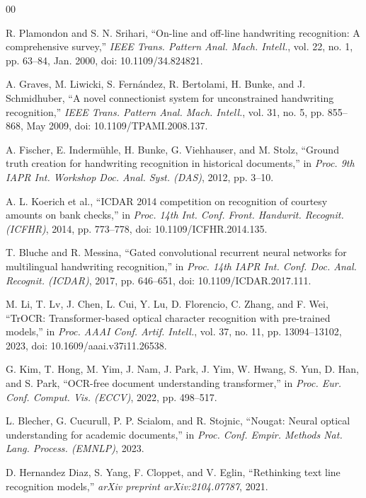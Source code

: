 \documentclass{IEEEtran}
\begin{document}
\begin{thebibliography}{00}

 R. Plamondon and S. N. Srihari, ``On-line and off-line handwriting recognition: A comprehensive survey,'' \emph{IEEE Trans. Pattern Anal. Mach. Intell.}, vol. 22, no. 1, pp. 63--84, Jan. 2000, doi: 10.1109/34.824821.

 A. Graves, M. Liwicki, S. Fern{\'a}ndez, R. Bertolami, H. Bunke, and J. Schmidhuber, ``A novel connectionist system for unconstrained handwriting recognition,'' \emph{IEEE Trans. Pattern Anal. Mach. Intell.}, vol. 31, no. 5, pp. 855--868, May 2009, doi: 10.1109/TPAMI.2008.137.

 A. Fischer, E. Inderm{\"u}hle, H. Bunke, G. Viehhauser, and M. Stolz, ``Ground truth creation for handwriting recognition in historical documents,'' in \emph{Proc. 9th IAPR Int. Workshop Doc. Anal. Syst. (DAS)}, 2012, pp. 3--10.

 A. L. Koerich et al., ``ICDAR 2014 competition on recognition of courtesy amounts on bank checks,'' in \emph{Proc. 14th Int. Conf. Front. Handwrit. Recognit. (ICFHR)}, 2014, pp. 773--778, doi: 10.1109/ICFHR.2014.135.

 T. Bluche and R. Messina, ``Gated convolutional recurrent neural networks for multilingual handwriting recognition,'' in \emph{Proc. 14th IAPR Int. Conf. Doc. Anal. Recognit. (ICDAR)}, 2017, pp. 646--651, doi: 10.1109/ICDAR.2017.111.

 M. Li, T. Lv, J. Chen, L. Cui, Y. Lu, D. Florencio, C. Zhang, and F. Wei, ``TrOCR: Transformer-based optical character recognition with pre-trained models,'' in \emph{Proc. AAAI Conf. Artif. Intell.}, vol. 37, no. 11, pp. 13094--13102, 2023, doi: 10.1609/aaai.v37i11.26538.

 G. Kim, T. Hong, M. Yim, J. Nam, J. Park, J. Yim, W. Hwang, S. Yun, D. Han, and S. Park, ``OCR-free document understanding transformer,'' in \emph{Proc. Eur. Conf. Comput. Vis. (ECCV)}, 2022, pp. 498--517.

 L. Blecher, G. Cucurull, P. P. Scialom, and R. Stojnic, ``Nougat: Neural optical understanding for academic documents,'' in \emph{Proc. Conf. Empir. Methods Nat. Lang. Process. (EMNLP)}, 2023.

 D. Hernandez Diaz, S. Yang, F. Cloppet, and V. Eglin, ``Rethinking text line recognition models,'' \emph{arXiv preprint arXiv:2104.07787}, 2021.


\end{thebibliography}
\end{document}
